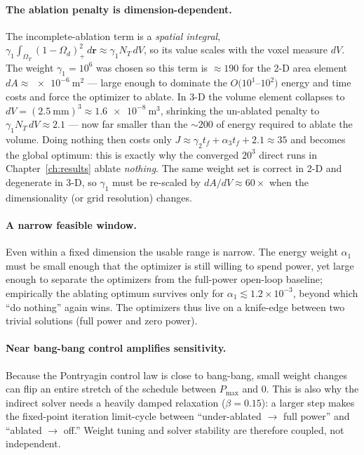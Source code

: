 \paragraph{The ablation penalty is dimension-dependent.}
The incomplete-ablation term is a \emph{spatial integral},
$\gamma_1 \int_{\Omega_T}(1-\Omega_d)_+^2\,d\mathbf{r} \approx \gamma_1 N_T\,dV$,
so its value scales with the voxel measure $dV$. The weight
$\gamma_1 = 10^6$ was chosen so this term is $\approx 190$ for the 2-D area
element $dA \approx \SI{e-6}{\square\meter}$ --- large enough to dominate
the $O(10^1$--$10^2)$ energy and time costs and force the optimizer to
ablate. In 3-D the volume element collapses to
$dV = (\SI{2.5}{\mm})^3 \approx \SI{1.6e-8}{\cubic\meter}$, shrinking the
un-ablated penalty to $\gamma_1 N_T\,dV \approx 2.1$ --- now far smaller
than the $\sim\!200$ of energy required to ablate the volume. Doing nothing
then costs only $J \approx \gamma_2 t_f + \alpha_3 t_f + 2.1 \approx 35$ and
becomes the global optimum: this is exactly why the converged $20^3$ direct
runs in Chapter~\ref{ch:results} ablate \emph{nothing}. The same weight set
is correct in 2-D and degenerate in 3-D, so $\gamma_1$ must be re-scaled by
$dA/dV \approx 60\times$ when the dimensionality (or grid resolution)
changes.

\paragraph{A narrow feasible window.}
Even within a fixed dimension the usable range is narrow. The energy weight
$\alpha_1$ must be small enough that the optimizer is still willing to spend
power, yet large enough to separate the optimizers from the full-power
open-loop baseline; empirically the ablating optimum survives only for
$\alpha_1 \lesssim 1.2\times10^{-3}$, beyond which ``do nothing'' again
wins. The optimizers thus live on a knife-edge between two trivial
solutions (full power and zero power).

\paragraph{Near bang-bang control amplifies sensitivity.}
Because the Pontryagin control law is close to bang-bang, small weight
changes can flip an entire stretch of the schedule between $P_{\max}$ and
$0$. This is also why the indirect solver needs a heavily damped relaxation
($\beta = 0.15$): a larger step makes the fixed-point iteration limit-cycle
between ``under-ablated $\to$ full power'' and ``ablated $\to$ off.'' Weight
tuning and solver stability are therefore coupled, not independent.

